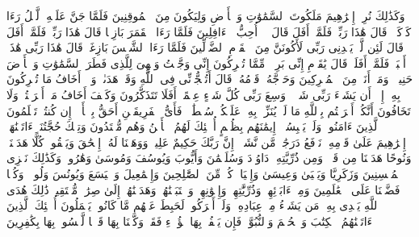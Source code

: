 \stopbuffer%
\startbuffer[\q:6:75]
وَكَذَٰلِكَ نُرِیۤ إِبۡرَٰهِیمَ مَلَكُوتَ ٱلسَّمَٰوَٰتِ وَٱلۡأَرۡضِ وَلِیَكُونَ مِنَ ٱلۡمُوقِنِینَ%
\stopbuffer%
\startbuffer[\q:6:76]
فَلَمَّا جَنَّ عَلَیۡهِ ٱلَّیۡلُ رَءَا كَوۡكَبࣰاۖ قَالَ هَٰذَا رَبِّیۖ فَلَمَّاۤ أَفَلَ قَالَ لَاۤ أُحِبُّ ٱلۡءَافِلِینَ%
\stopbuffer%
\startbuffer[\q:6:77]
فَلَمَّا رَءَا ٱلۡقَمَرَ بَازِغࣰا قَالَ هَٰذَا رَبِّیۖ فَلَمَّاۤ أَفَلَ قَالَ لَئِن لَّمۡ یَهۡدِنِی رَبِّی لَأَكُونَنَّ مِنَ ٱلۡقَوۡمِ ٱلضَّاۤلِّینَ%
\stopbuffer%
\startbuffer[\q:6:78]
فَلَمَّا رَءَا ٱلشَّمۡسَ بَازِغَةࣰ قَالَ هَٰذَا رَبِّی هَٰذَاۤ أَكۡبَرُۖ فَلَمَّاۤ أَفَلَتۡ قَالَ یَٰقَوۡمِ إِنِّی بَرِیۤءࣱ مِّمَّا تُشۡرِكُونَ%
\stopbuffer%
\startbuffer[\q:6:79]
إِنِّی وَجَّهۡتُ وَجۡهِیَ لِلَّذِی فَطَرَ ٱلسَّمَٰوَٰتِ وَٱلۡأَرۡضَ حَنِیفࣰاۖ وَمَاۤ أَنَا۠ مِنَ ٱلۡمُشۡرِكِینَ%
\stopbuffer%
\startbuffer[\q:6:80]
وَحَاۤجَّهُۥ قَوۡمُهُۥۚ قَالَ أَتُحَٰۤجُّوۤنِّی فِی ٱللَّهِ وَقَدۡ هَدَىٰنِۚ وَلَاۤ أَخَافُ مَا تُشۡرِكُونَ بِهِۦۤ إِلَّاۤ أَن یَشَاۤءَ رَبِّی شَیۡءࣰاۚ وَسِعَ رَبِّی كُلَّ شَیۡءٍ عِلۡمًاۚ أَفَلَا تَتَذَكَّرُونَ%
\stopbuffer%
\startbuffer[\q:6:81]
وَكَیۡفَ أَخَافُ مَاۤ أَشۡرَكۡتُمۡ وَلَا تَخَافُونَ أَنَّكُمۡ أَشۡرَكۡتُم بِٱللَّهِ مَا لَمۡ یُنَزِّلۡ بِهِۦ عَلَیۡكُمۡ سُلۡطَٰنࣰاۚ فَأَیُّ ٱلۡفَرِیقَیۡنِ أَحَقُّ بِٱلۡأَمۡنِۖ إِن كُنتُمۡ تَعۡلَمُونَ%
\stopbuffer%
\startbuffer[\q:6:82]
ٱلَّذِینَ ءَامَنُوا۟ وَلَمۡ یَلۡبِسُوۤا۟ إِیمَٰنَهُم بِظُلۡمٍ أُو۟لَٰۤئِكَ لَهُمُ ٱلۡأَمۡنُ وَهُم مُّهۡتَدُونَ%
\stopbuffer%
\startbuffer[\q:6:83]
وَتِلۡكَ حُجَّتُنَاۤ ءَاتَیۡنَٰهَاۤ إِبۡرَٰهِیمَ عَلَىٰ قَوۡمِهِۦۚ نَرۡفَعُ دَرَجَٰتࣲ مَّن نَّشَاۤءُۗ إِنَّ رَبَّكَ حَكِیمٌ عَلِیمࣱ%
\stopbuffer%
\startbuffer[\q:6:84]
وَوَهَبۡنَا لَهُۥۤ إِسۡحَٰقَ وَیَعۡقُوبَۚ كُلًّا هَدَیۡنَاۚ وَنُوحًا هَدَیۡنَا مِن قَبۡلُۖ وَمِن ذُرِّیَّتِهِۦ دَاوُۥدَ وَسُلَیۡمَٰنَ وَأَیُّوبَ وَیُوسُفَ وَمُوسَىٰ وَهَٰرُونَۚ وَكَذَٰلِكَ نَجۡزِی ٱلۡمُحۡسِنِینَ%
\stopbuffer%
\startbuffer[\q:6:85]
وَزَكَرِیَّا وَیَحۡیَىٰ وَعِیسَىٰ وَإِلۡیَاسَۖ كُلࣱّ مِّنَ ٱلصَّٰلِحِینَ%
\stopbuffer%
\startbuffer[\q:6:86]
وَإِسۡمَٰعِیلَ وَٱلۡیَسَعَ وَیُونُسَ وَلُوطࣰاۚ وَكُلࣰّا فَضَّلۡنَا عَلَى ٱلۡعَٰلَمِینَ%
\stopbuffer%
\startbuffer[\q:6:87]
وَمِنۡ ءَابَاۤئِهِمۡ وَذُرِّیَّٰتِهِمۡ وَإِخۡوَٰنِهِمۡۖ وَٱجۡتَبَیۡنَٰهُمۡ وَهَدَیۡنَٰهُمۡ إِلَىٰ صِرَٰطࣲ مُّسۡتَقِیمࣲ%
\stopbuffer%
\startbuffer[\q:6:88]
ذَٰلِكَ هُدَى ٱللَّهِ یَهۡدِی بِهِۦ مَن یَشَاۤءُ مِنۡ عِبَادِهِۦۚ وَلَوۡ أَشۡرَكُوا۟ لَحَبِطَ عَنۡهُم مَّا كَانُوا۟ یَعۡمَلُونَ%
\stopbuffer%
\startbuffer[\q:6:89]
أُو۟لَٰۤئِكَ ٱلَّذِینَ ءَاتَیۡنَٰهُمُ ٱلۡكِتَٰبَ وَٱلۡحُكۡمَ وَٱلنُّبُوَّةَۚ فَإِن یَكۡفُرۡ بِهَا هَٰۤؤُلَاۤءِ فَقَدۡ وَكَّلۡنَا بِهَا قَوۡمࣰا لَّیۡسُوا۟ بِهَا بِكَٰفِرِینَ%
